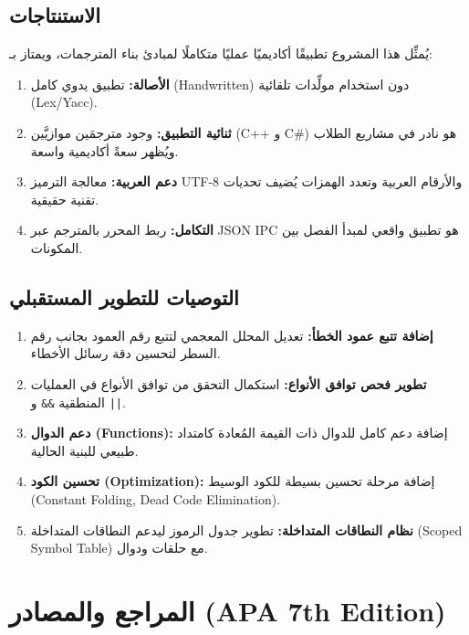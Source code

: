 \documentclass[12pt,a4paper]{report}
\begin{document}
\section{الاستنتاجات}

يُمثِّل هذا المشروع تطبيقًا أكاديميًا عمليًا متكاملًا لمبادئ بناء المترجمات، ويمتاز بـ:

\begin{enumerate}[label=\textbf{\arabic*.}, rightmargin=0.5cm]
    \item \textbf{الأصالة:} تطبيق يدوي كامل (Handwritten) دون استخدام مولِّدات تلقائية (Lex/Yacc).
    \item \textbf{ثنائية التطبيق:} وجود مترجمَين موازيَّين (C++ و C\#) هو نادر في مشاريع الطلاب ويُظهر سعةً أكاديمية واسعة.
    \item \textbf{دعم العربية:} معالجة الترميز UTF-8 والأرقام العربية وتعدد الهمزات يُضيف تحديات تقنية حقيقية.
    \item \textbf{التكامل:} ربط المحرر بالمترجم عبر JSON IPC هو تطبيق واقعي لمبدأ الفصل بين المكونات.
\end{enumerate}

\section{التوصيات للتطوير المستقبلي}

\begin{enumerate}[label=\textbf{\arabic*.}, rightmargin=0.5cm]
    \item \textbf{إضافة تتبع عمود الخطأ:} تعديل المحلل المعجمي لتتبع رقم العمود بجانب رقم السطر لتحسين دقة رسائل الأخطاء.
    \item \textbf{تطوير فحص توافق الأنواع:} استكمال التحقق من توافق الأنواع في العمليات المنطقية \texttt{\&\&} و \texttt{||}.
    \item \textbf{دعم الدوال (Functions):} إضافة دعم كامل للدوال ذات القيمة المُعادة كامتداد طبيعي للبنية الحالية.
    \item \textbf{تحسين الكود (Optimization):} إضافة مرحلة تحسين بسيطة للكود الوسيط (Constant Folding, Dead Code Elimination).
    \item \textbf{نظام النطاقات المتداخلة:} تطوير جدول الرموز ليدعم النطاقات المتداخلة (Scoped Symbol Table) مع حلقات ودوال.
\end{enumerate}

\chapter*{المراجع والمصادر (APA 7th Edition)}
\end{document}

